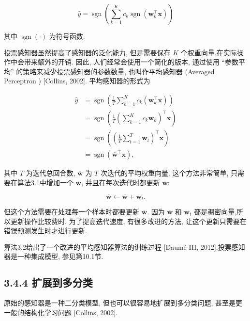 \documentclass[10pt]{article}
\begin{document}
\begin{equation*}
\hat{y}=\operatorname{sgn}\left(\sum_{k=1}^{K} c_{k} \operatorname{sgn}\left(\boldsymbol{w}_{k}^{\top} \boldsymbol{x}\right)\right) \tag{3.72}
\end{equation*}


其中 $\operatorname{sgn}(\cdot)$ 为符号函数.

投票感知器虽然提高了感知器的泛化能力, 但是需要保存 $K$ 个权重向量.在实际操作中会带来额外的开销. 因此, 人们经常会使用一个简化的版本, 通过使用 “参数平均” 的策略来减少投票感知器的参数数量, 也叫作平均感知器 (Averaged Perceptron ) [Collins, 2002]. 平均感知器的形式为


\begin{align*}
\hat{y} & =\operatorname{sgn}\left(\frac{1}{T} \sum_{k=1}^{K} c_{k}\left(\boldsymbol{w}_{k}^{\top} \boldsymbol{x}\right)\right)  \tag{3.73}\\
& =\operatorname{sgn}\left(\frac{1}{T}\left(\sum_{k=1}^{K} c_{k} \boldsymbol{w}_{k}\right)^{\top} \boldsymbol{x}\right)  \tag{3.74}\\
& =\operatorname{sgn}\left(\left(\frac{1}{T} \sum_{t=1}^{T} \boldsymbol{w}_{t}\right)^{\top} \boldsymbol{x}\right)  \tag{3.75}\\
& =\operatorname{sgn}\left(\overline{\boldsymbol{w}}^{\top} \boldsymbol{x}\right), \tag{3.76}
\end{align*}


其中 $T$ 为迭代总回合数, $\overline{\boldsymbol{w}}$ 为 $T$ 次迭代的平均权重向量. 这个方法非常简单, 只需要在算法3.1中增加一个 $\overline{\boldsymbol{w}}$, 并且在每次迭代时都更新 $\overline{\boldsymbol{w}}:$


\begin{equation*}
\overline{\boldsymbol{w}} \leftarrow \overline{\boldsymbol{w}}+\boldsymbol{w}_{t} . \tag{3.77}
\end{equation*}


但这个方法需要在处理每一个样本时都要更新 $\overline{\boldsymbol{w}}$. 因为 $\overline{\boldsymbol{w}}$ 和 $\boldsymbol{w}_{t}$ 都是稠密向量,所以更新操作比较费时. 为了提高迭代速度, 有很多改进的方法, 让这个更新只需要在错误预测发生时才进行更新.

算法3.2给出了一个改进的平均感知器算法的训练过程 [Daumé III, 2012].投票感知器是一种集成模型, 参见第10.1节.



\subsection*{3.4.4 扩展到多分类}
原始的感知器是一种二分类模型, 但也可以很容易地扩展到多分类问题, 甚至是更一般的结构化学习问题 [Collins, 2002].
\end{document}
